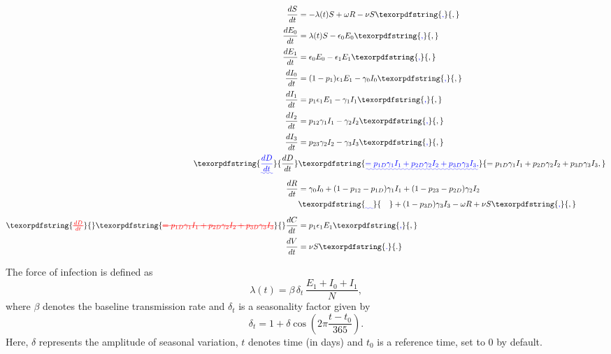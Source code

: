 \documentclass[10pt,letterpaper]{article}
\makeatletter
\providecommand{\DIFaddtex}[1]{{\protect\color{blue}\uwave{#1}}} %
\providecommand{\DIFdeltex}[1]{{\protect\color{red}\sout{#1}}} %
\providecommand{\DIFaddbegin}{} %
\providecommand{\DIFaddend}{} %
\providecommand{\DIFdelbegin}{} %
\providecommand{\DIFdelend}{} %
\providecommand{\DIFadd}[1]{\texorpdfstring{\DIFaddtex{#1}}{#1}} %
\providecommand{\DIFdel}[1]{\texorpdfstring{\DIFdeltex{#1}}{}} %
\providecommand{\DIFscaledelfig}{0.5}
\newlength{\DIFdelgraphicswidth} %
\newlength{\DIFdelgraphicsheight} %
\providecommand{\DIFaddincludegraphics}[2][]{{\color{blue}\fbox{\DIFOincludegraphics[#1]{#2}}}} %
\providecommand{\DIFdelincludegraphics}[2][]{%
\sbox{\DIFdelgraphicsbox}{\DIFOincludegraphics[#1]{#2}}%
\settoboxwidth{\DIFdelgraphicswidth}{\DIFdelgraphicsbox} %
\settoboxtotalheight{\DIFdelgraphicsheight}{\DIFdelgraphicsbox} %
\scalebox{\DIFscaledelfig}{%
\parbox[b]{\DIFdelgraphicswidth}{\usebox{\DIFdelgraphicsbox}\\[-\baselineskip] \rule{\DIFdelgraphicswidth}{0em}}\llap{\resizebox{\DIFdelgraphicswidth}{\DIFdelgraphicsheight}{%
\setlength{\unitlength}{\DIFdelgraphicswidth}%
\begin{picture}(1,1)%
\thicklines\linethickness{2pt} %
{\color[rgb]{1,0,0}\put(0,0){\framebox(1,1){}}}%
{\color[rgb]{1,0,0}\put(0,0){\line( 1,1){1}}}%
{\color[rgb]{1,0,0}\put(0,1){\line(1,-1){1}}}%
\end{picture}%
}\hspace*{3pt}}} %
} %
\DeclareRobustCommand{\DIFaddbegin}{\DIFOaddbegin \let\includegraphics\DIFaddincludegraphics} %
\DeclareRobustCommand{\DIFaddend}{\DIFOaddend \let\includegraphics\DIFOincludegraphics} %
\DeclareRobustCommand{\DIFdelbegin}{\DIFOdelbegin \let\includegraphics\DIFdelincludegraphics} %
\DeclareRobustCommand{\DIFdelend}{\DIFOaddend \let\includegraphics\DIFOincludegraphics} %
\let\sout@orig\sout %
\renewcommand{\sout}[1]{\ifmmode\text{\sout@orig{\ensuremath{#1}}}\else\sout@orig{#1}\fi} %
\makeatother
\begin{document}
\DIFaddend \begin{align}
\frac{dS}{dt} &= - \lambda(t) S + \omega R - \nu S\DIFaddbegin \DIFadd{, }\DIFaddend \nonumber\\
\frac{dE_0}{dt} &= \lambda(t) S - \epsilon_0 E_0\DIFaddbegin \DIFadd{, }\DIFaddend \nonumber\\
\frac{dE_1}{dt} &= \epsilon_0 E_0 - \epsilon_1 E_1\DIFaddbegin \DIFadd{, }\DIFaddend \nonumber\\
\frac{dI_0}{dt} &= (1 - p_1) \epsilon_1 E_1 - \gamma_0 I_0\DIFaddbegin \DIFadd{, }\DIFaddend \nonumber\\
\frac{dI_1}{dt} &= p_1 \epsilon_1 E_1 - \gamma_1 I_1\DIFaddbegin \DIFadd{, }\DIFaddend \label{eq:cov} \\
\frac{dI_2}{dt} &= p_{12} \gamma_1 I_1 - \gamma_2 I_2\DIFaddbegin \DIFadd{, }\DIFaddend \nonumber \\
\frac{dI_3}{dt} &= p_{23} \gamma_2 I_2 - \gamma_3 I_3\DIFaddbegin \DIFadd{, }\DIFaddend \nonumber\\
\DIFaddbegin \DIFadd{\frac{dD}{dt} }&\DIFadd{= p_{1D} \gamma_1 I_1 + p_{2D} \gamma_2 I_2 + p_{3D} \gamma_3 I_3, }\nonumber\\
\DIFaddend \frac{dR}{dt} &= \gamma_0 I_0 + (1 - p_{12} - p_{1D}) \gamma_1 I_1 \DIFdelbegin %
\DIFdelend + (1 - p_{23} - p_{2D}) \gamma_2 I_2 \DIFaddbegin \nonumber\\
&\DIFadd{\quad }\DIFaddend + (1 - p_{3D}) \gamma_3 I_3 \DIFdelbegin %
\DIFdelend - \omega R + \nu S\DIFaddbegin \DIFadd{, }\DIFaddend \nonumber\\
\DIFdelbegin \DIFdel{\frac{dD}{dt} }%
\DIFdel{= p_{1D} \gamma_1 I_1 + p_{2D} \gamma_2 I_2 + p_{3D} \gamma_3 I_3 }%
\DIFdelend \frac{dC}{dt} &= p_1 \epsilon_1 E_1\DIFaddbegin \DIFadd{, }\DIFaddend \nonumber\\
\frac{dV}{dt} &= \nu S\DIFaddbegin \DIFadd{. }\DIFaddend \nonumber
\end{align}

The force of infection is defined as
\[
\lambda(t) = \beta \, \delta_t \, \frac{E_1 + I_0 + I_1}{N},
\]
where \(\beta\) denotes the baseline transmission rate and
\(\delta_t\) is a seasonality factor given by
\[
\delta_t = 1 + \delta \cos\!\left(2\pi \frac{t - t_0}{365}\right).
\]
Here, \(\delta\) represents the amplitude of seasonal variation, \(t\) denotes
time (in days) and \(t_0\) is a reference time, set to \(0\) by default.
\end{document}
